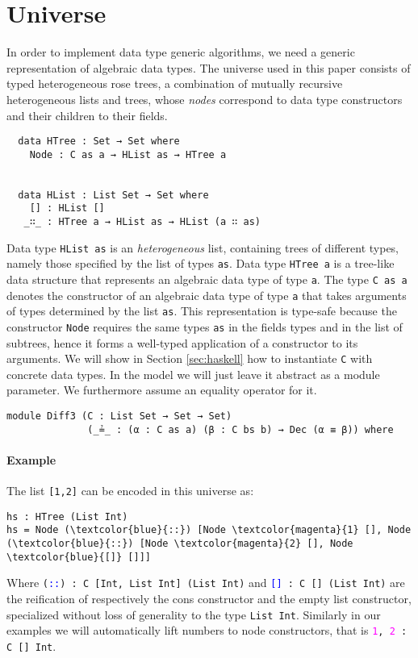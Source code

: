 \documentclass{sigplanconf}
\theoremstyle{plain}
\begin{document}
\section{Universe}
In order to implement data type generic algorithms, we need a generic
representation of algebraic data types.
%
The universe used in this paper consists of typed heterogeneous rose
trees, a combination of mutually recursive heterogeneous lists and
trees, whose \emph{nodes} correspond to data type constructors and
their children to their fields.
\begin{verbatim}
  data HTree : Set → Set where
    Node : C as a → HList as → HTree a


  data HList : List Set → Set where
    [] : HList []
   _∷_ : HTree a → HList as → HList (a ∷ as)
\end{verbatim}
Data type \texttt{HList as} is an \emph{heterogeneous} list,
containing trees of different types, namely those specified by the
list of types \texttt{as}.
%
Data type \texttt{HTree a} is a tree-like data structure that represents an
algebraic data type of type \texttt{a}.
%
The type \texttt{C as a} denotes the constructor of an algebraic data
type of type \texttt{a} that takes arguments of types determined by
the list \texttt{as}.
  This representation is type-safe because the constructor
  \texttt{Node} requires the same types \texttt{as} in the fields
  types and in the list of subtrees, hence it forms a well-typed
  application of a constructor to its arguments.
  We will show in Section \ref{sec:haskell} how to instantiate
  \texttt{C} with concrete data types. In the model we will just leave
  it abstract as a module parameter.  We furthermore assume an
  equality operator for it.

\begin{verbatim}
module Diff3 (C : List Set → Set → Set) 
              (_≟_ : (α : C as a) (β : C bs b) → Dec (α ≡ β)) where
\end{verbatim}
	
        \paragraph{Example} 
        The list \texttt{[1,2]} can be encoded in this universe as: 
\begin{Verbatim}[commandchars=\\\{\}]
hs : HTree (List Int)
hs = Node (\textcolor{blue}{::}) [Node \textcolor{magenta}{1} [], Node (\textcolor{blue}{::}) [Node \textcolor{magenta}{2} [], Node \textcolor{blue}{[]} []]]
\end{Verbatim}
        Where \texttt{(\textcolor{blue}{::}) : C [Int, List Int] (List Int)}
        and \texttt{\textcolor{blue}{[]} : C [] (List Int)} are the reification of respectively the cons constructor and the
        empty list constructor, specialized without loss of generality to the type \texttt{List Int}.
        Similarly in our examples we will automatically lift numbers to node constructors, that is
        \texttt{\textcolor{magenta}{1}, \textcolor{magenta}{2} : C [] Int}.
\end{document}
